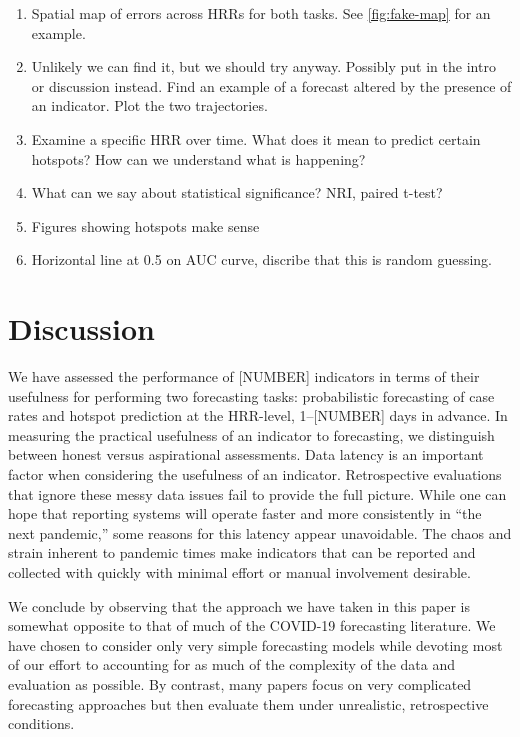 \documentclass[9pt,twocolumn,twoside,lineno]{pnas-new}
\begin{document}
\begin{enumerate}
\item Spatial map of errors across HRRs for both tasks. See
  \autoref{fig:fake-map} for an example. 
\item Unlikely we can find it, but we should try anyway. Possibly put in the
  intro or discussion instead. Find an example of a forecast altered by the
  presence of an indicator.  Plot the two trajectories.
\item Examine a specific HRR over time. What does it mean to predict certain
  hotspots? How can we understand what is happening?
 \item What can we say about statistical significance? NRI, paired t-test?
 \item Figures showing hotspots make sense
 \item Horizontal line at 0.5 on AUC curve, discribe that this is random
   guessing. 
\end{enumerate}


\section{Discussion}

We have assessed the performance of [NUMBER] indicators in terms of their
usefulness for performing two forecasting tasks: probabilistic
forecasting of case
rates and hotspot prediction at the HRR-level, 1--[NUMBER] days in advance.
In measuring the practical usefulness of an indicator to forecasting,
we distinguish between honest versus aspirational assessments.  Data
latency is an important factor when considering the usefulness of an
indicator.  Retrospective evaluations that ignore these messy data
issues fail to provide the full picture.  While one can hope that reporting
systems will operate faster and more consistently in ``the next
pandemic,'' some reasons for this latency appear unavoidable.  The
chaos and strain inherent to pandemic times make indicators that can
be reported and collected with quickly with minimal effort or manual
involvement desirable.

We conclude by observing that the
approach we have taken in this paper is somewhat opposite to that of much of the COVID-19
forecasting literature.  We have chosen to consider only very simple forecasting models while devoting most of our effort to accounting for as much of the complexity of
the data and evaluation as possible.  By contrast, many papers focus
on very complicated forecasting approaches but then evaluate them
under unrealistic, retrospective conditions.
\end{document}

